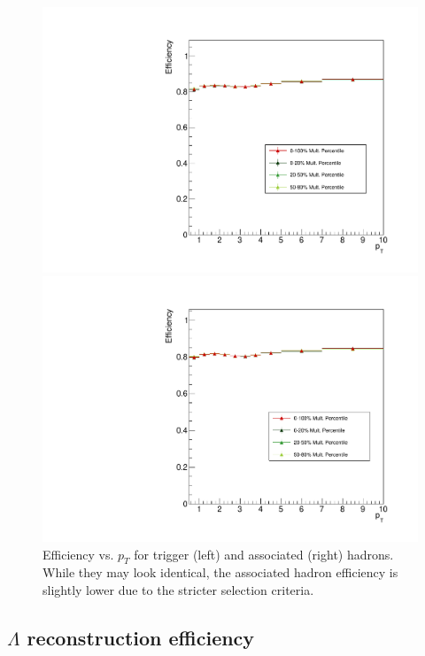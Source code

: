 \begin{figure}[h]
	\centering
	\begin{minipage}{0.48\textwidth}
		\includegraphics[width=\textwidth]{figures/analysis/trigger_efficiency.pdf}
	\end{minipage}
	\begin{minipage}{0.48\textwidth}
		\includegraphics[width=\textwidth]{figures/analysis/associated_efficiency.pdf}
	\end{minipage}
	\caption{Efficiency vs. $p_T$ for trigger (left) and associated (right) hadrons. While they may look identical, the associated hadron efficiency is slightly lower due to the stricter selection criteria.}
	\label{fig:trigassoc_eff_pt}
\end{figure}

\subsection{$\Lambda$ reconstruction efficiency}

